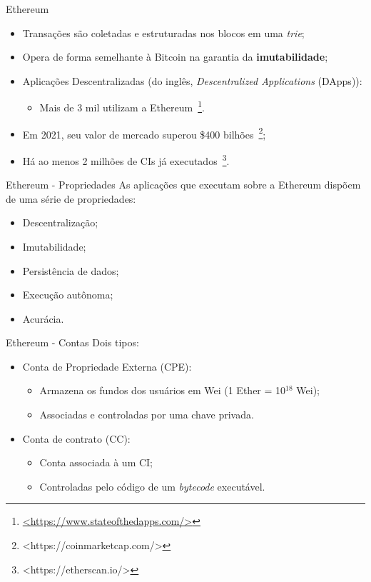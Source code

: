\begin{frame}{Ethereum}
    \begin{itemize}
        \item Transações são coletadas e estruturadas nos blocos em uma \textit{trie};
        \item Opera de forma semelhante à Bitcoin na garantia da \textbf{imutabilidade};
        \item Aplicações Descentralizadas (do inglês, \textit{Descentralized Applications} (DApps)):
        \begin{itemize}
            \item Mais de 3 mil utilizam a Ethereum~\footnote{\url{<https://www.stateofthedapps.com/>}}.
        \end{itemize}
        \item Em 2021, seu valor de mercado superou \$400 bilhões~\footnote{<https://coinmarketcap.com/>};
        \item Há ao menos 2 milhões de CIs já executados~\footnote{<https://etherscan.io/>}.
    \end{itemize}
\end{frame}

\begin{frame}{Ethereum - Propriedades}
    As aplicações que executam sobre a Ethereum dispõem de uma série de propriedades:
    \begin{itemize}
        \item Descentralização;
        \item Imutabilidade;
        \item Persistência de dados;
        \item Execução autônoma;
        \item Acurácia.
    \end{itemize}
\end{frame}

\begin{frame}{Ethereum - Contas}
    Dois tipos:
    \begin{itemize}
        \item Conta de Propriedade Externa (CPE):
        \begin{itemize}
            \item Armazena os fundos dos usuários em Wei (1 Ether = 10$^{18}$ Wei);
            \item Associadas e controladas por uma chave privada.
        \end{itemize}
        \item Conta de contrato (CC):
        \begin{itemize}
            \item Conta associada à um CI;
            \item Controladas pelo código de um \textit{bytecode} executável.
        \end{itemize}
    \end{itemize}
\end{frame}

